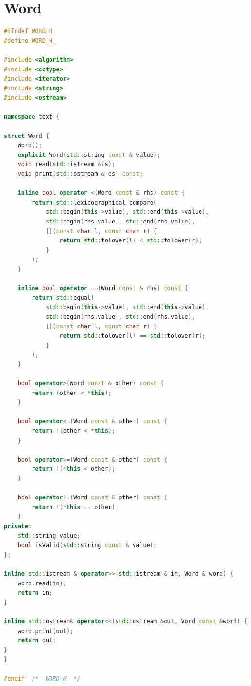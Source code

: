 \section{Word}
\begin{lstlisting}[language=C++]
#ifndef	WORD_H_
#define	WORD_H_

#include <algorithm>
#include <cctype>
#include <iterator>
#include <string>
#include <ostream>

namespace text {

struct Word {
	Word();
	explicit Word(std::string const & value);
	void read(std::istream &is);
	void print(std::ostream & os) const;

	inline bool operator <(Word const & rhs) const {
		return std::lexicographical_compare(
			std::begin(this->value), std::end(this->value),
			std::begin(rhs.value), std::end(rhs.value),
			[](const char l, const char r) {
				return std::tolower(l) < std::tolower(r);
			}
		);
	}

	inline bool operator ==(Word const & rhs) const {
		return std::equal(
			std::begin(this->value), std::end(this->value),
			std::begin(rhs.value), std::end(rhs.value),
			[](const char l, const char r) {
				return std::tolower(l) == std::tolower(r);
			}
		);
	}

	bool operator>(Word const & other) const {
		return (other < *this);
	}

	bool operator<=(Word const & other) const {
		return !(other < *this);
	}

	bool operator>=(Word const & other) const {
		return !(*this < other);
	}

	bool operator!=(Word const & other) const {
		return !(*this == other);
	}
private:
	std::string value;
	bool isValid(std::string const & value);
};

inline std::istream & operator>>(std::istream & in, Word & word) {
	word.read(in);
	return in;
}

inline std::ostream& operator<<(std::ostream &out, Word const &word) {
	word.print(out);
	return out;
}
}

#endif	/*	WORD_H_	*/
\end{lstlisting}
